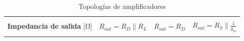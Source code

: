 \documentclass[10pt]{article}
\begin{document}
\begin{table}
\begin{tabular}{|p{3cm}|c|c|c|}
		\hline
		                                           &                                                                                                                                                                                                      &                                       &                                                    \\
		\textbf{Impedancia de salida} [\si{\ohm}]  & $R_{out} = R_D\parallel R_L$                                                                                                                                                                         & $R_{out} = R_D$                       & $R_{out} = R_S\parallel\frac{1}{g_m}$              \\
		                                           &                                                                                                                                                                                                      &                                       &                                                    \\
		\hline
	\end{tabular}
	\caption{Topologías de amplificadores}
\end{table}
\end{document}

